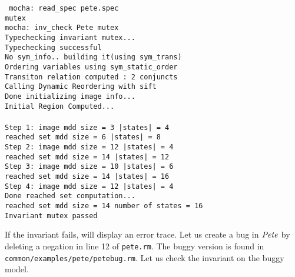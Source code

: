 \mypar
{\tt 
mocha: read\_spec pete.spec \\
mutex \\
mocha: inv\_check Pete mutex \\
Typechecking invariant mutex... \\
Typechecking successful \\
No sym\_info.. building it(using sym\_trans) \\
Ordering variables using sym\_static\_order \\
Transiton relation computed : 2 conjuncts \\
Calling Dynamic Reordering with sift \\
Done initializing image info...\\
Initial Region Computed... \\
\\
Step 1: image mdd size =          3	 |states| =        4	\\
reached set mdd size =          6	 |states| =        8 \\
Step 2: image mdd size =         12	 |states| =        4 \\
reached set mdd size =         14	 |states| =       12 \\
Step 3: image mdd size =         10	 |states| =        6 \\
reached set mdd size =         14	 |states| =       16 \\
Step 4: image mdd size =         12	 |states| =        4 \\
Done reached set computation... \\
reached set mdd size =         14	 number of states =       16 \\
Invariant mutex passed\\
}

\mypar
If the invariant fails, \mocha will display an error trace.
Let us create a bug in ${\it Pete\/}$ by deleting a negation in line 12
of {\tt pete.rm}. The buggy version is found in 
{\tt common/examples/pete/petebug.rm}. Let us check the invariant
on the buggy model.

